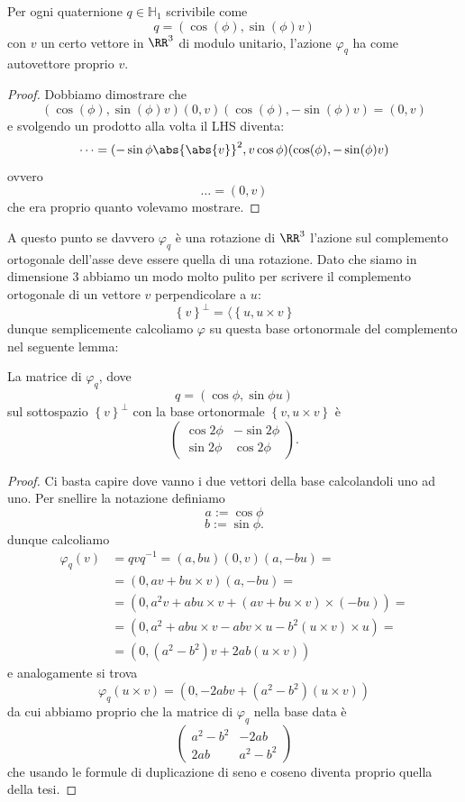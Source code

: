 \documentclass[11pt]{scrartcl}
\begin{document}
   	 \begin{proposition}
   	 	Per ogni quaternione $q\in \mathbb{H}_1$ scrivibile come
   	 	$$q=\left(\cos(\phi),\sin(\phi)v\right)$$
   	 	con $v$ un certo vettore in $\RR^3$ di modulo unitario, l'azione $\varphi_q$ ha come autovettore proprio $v$.
   	 \end{proposition}
   	 \begin{proof}
   	 	Dobbiamo dimostrare che
   	 	$$(\cos(\phi),\sin(\phi)v)(0,v)(\cos(\phi),-\sin(\phi)v)=(0,v)$$
   	 	e svolgendo un prodotto alla volta il LHS diventa:
   	 	$$\dots=(-\sin\phi\abs{\abs{v}}^2,v\cos\phi)(\cos(\phi),-\sin(\phi)v)$$
   	 	ovvero
   	 	$$\dots=(0,v)$$
   	 	che era proprio quanto volevamo mostrare.
   	 \end{proof}
   	 A questo punto se davvero $\varphi_q$ è una rotazione di $\RR^3$ l'azione sul complemento ortogonale dell'asse deve essere quella di una rotazione. Dato che siamo in dimensione $3$ abbiamo un modo molto pulito per scrivere il complemento ortogonale di un vettore $v$ perpendicolare a $u$:
   	 $$\left\{v\right\}^\perp=\langle\left\{u,u\times v\right\}$$
   	 dunque semplicemente calcoliamo $\varphi$ su questa base ortonormale del complemento nel seguente lemma:
   	 \begin{lemma}
   	 	La matrice di $\varphi_q$, dove 
   	 	$$q=(\cos\phi,\sin\phi u)$$
   	 	sul sottospazio $\left\{v\right\}^\perp$ con la base ortonormale $\left\{v,u\times v\right\}$ è 
   	 	$$
   	 	\begin{pmatrix}
   	 		\cos 2\phi & -\sin 2\phi \\
   	 		\sin 2\phi & \cos 2\phi
   	 	\end{pmatrix}.
   	 	$$
   	 \end{lemma}
   	 \begin{proof}
   	 	Ci basta capire dove vanno i due vettori della base calcolandoli uno ad uno. Per snellire la notazione definiamo
   	 	$$a:=\cos \phi$$
   	 	$$b:=\sin \phi.$$
   	 	dunque calcoliamo
   	 	\begin{align*}
   	 		\varphi_q(v) & =qvq^{-1}=(a,bu)(0,v)(a,-bu)= \\
   	 		& = (0,av+bu\times v)(a,-bu) =\\
   	 		& = (0,a^2v+abu\times v+(av+bu\times v)\times (-bu))= \\
   	 		& = (0,a^2+abu\times v-abv\times u-b^2(u\times v)\times u)= \\
   	 		& = (0,(a^2-b^2)v+2ab(u\times v))
   	 	\end{align*}
   	 	e analogamente si trova
   	 	$$\varphi_q(u\times v)=\left(0,-2abv+(a^2-b^2)(u\times v)\right)$$
   	 	da cui abbiamo proprio che la matrice di $\varphi_q$ nella base data è 
   	 	$$
   	 	\begin{pmatrix}
   	 		a^2 - b^2 & -2ab \\
   	 		2ab & a^2-b^2
   	 	\end{pmatrix}
   	 	$$
   	 	che usando le formule di duplicazione di seno e coseno diventa proprio quella della tesi.
   	 \end{proof}
\end{document}
